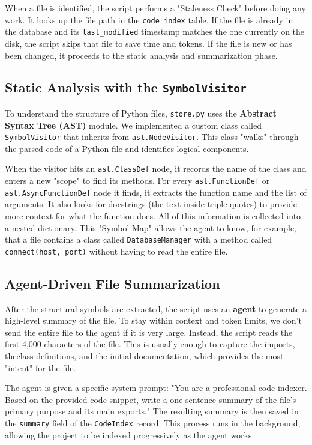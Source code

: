 \documentclass[conference]{IEEEtran}
\begin{document}
When a file is identified, the script performs a "Staleness Check" before doing any work. It looks up the file path in the \texttt{code\_index} table. If the file is already in the database and its \texttt{last\_modified} timestamp matches the one currently on the disk, the script skips that file to save time and tokens. If the file is new or has been changed, it proceeds to the static analysis and summarization phase.

\subsection{Static Analysis with the \texttt{SymbolVisitor}}
To understand the structure of Python files, \texttt{store.py} uses the \textbf{Abstract Syntax Tree (AST)} module. We implemented a custom class called \texttt{SymbolVisitor} that inherits from \texttt{ast.NodeVisitor}. This class "walks" through the parsed code of a Python file and identifies logical components.

When the visitor hits an \texttt{ast.ClassDef} node, it records the name of the class and enters a new "scope" to find its methods. For every \texttt{ast.FunctionDef} or \texttt{ast.AsyncFunctionDef} node it finds, it extracts the function name and the list of arguments. It also looks for docstrings (the text inside triple quotes) to provide more context for what the function does. All of this information is collected into a nested dictionary. This "Symbol Map" allows the agent to know, for example, that a file contains a class called \texttt{DatabaseManager} with a method called \texttt{connect(host, port)} without having to read the entire file.

\subsection{Agent-Driven File Summarization}
After the structural symbols are extracted, the script uses an \textbf{agent} to generate a high-level summary of the file. To stay within context and token limits, we don't send the entire file to the agent if it is very large. Instead, the script reads the first 4,000 characters of the file. This is usually enough to capture the imports, theclass definitions, and the initial documentation, which provides the most "intent" for the file.

The agent is given a specific system prompt: "You are a professional code indexer. Based on the provided code snippet, write a one-sentence summary of the file's primary purpose and its main exports." The resulting summary is then saved in the \texttt{summary} field of the \texttt{CodeIndex} record. This process runs in the background, allowing the project to be indexed progressively as the agent works.
\end{document}
